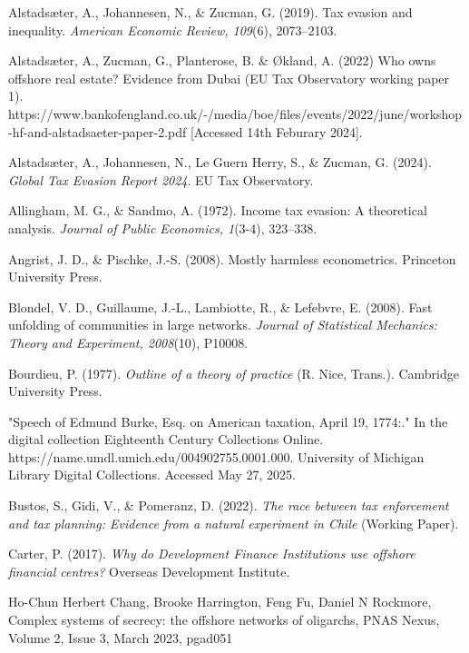 \begin{thebibliography}{99}

Alstads{\ae}ter, A., Johannesen, N., \& Zucman, G. (2019). Tax evasion and inequality. \textit{American Economic Review, 109}(6), 2073–2103. 

Alstadsæter, A., Zucman, G., Planterose, B. \& Økland, A. (2022) Who owns offshore real estate? Evidence from Dubai (EU Tax Observatory working paper 1). https://www.bankofengland.co.uk/-/media/boe/files/events/2022/june/workshop-hf-and-alstadsaeter-paper-2.pdf [Accessed 14th Feburary 2024].

Alstads{\ae}ter, A., Johannesen, N., Le Guern Herry, S., \& Zucman, G. (2024). \textit{Global Tax Evasion Report 2024}. EU Tax Observatory.

Allingham, M. G., \& Sandmo, A. (1972). Income tax evasion: A theoretical analysis. \textit{Journal of Public Economics, 1}(3-4), 323–338. 

Angrist, J. D., \& Pischke, J.-S. (2008). Mostly harmless econometrics. Princeton University Press.

Blondel, V. D., Guillaume, J.-L., Lambiotte, R., \& Lefebvre, E. (2008). Fast unfolding of communities in large networks. \textit{Journal of Statistical Mechanics: Theory and Experiment, 2008}(10), P10008. 

Bourdieu, P. (1977). \textit{Outline of a theory of practice} (R. Nice, Trans.). Cambridge University Press.

"Speech of Edmund Burke, Esq. on American taxation, April 19, 1774:." In the digital collection Eighteenth Century Collections Online. https://name.umdl.umich.edu/004902755.0001.000. University of Michigan Library Digital Collections. Accessed May 27, 2025.

Bustos, S., Gidi, V., \& Pomeranz, D. (2022). \textit{The race between tax enforcement and tax planning: Evidence from a natural experiment in Chile} (Working Paper).

Carter, P. (2017). \textit{Why do Development Finance Institutions use offshore financial centres?} Overseas Development Institute.

Ho-Chun Herbert Chang, Brooke Harrington, Feng Fu, Daniel N Rockmore, Complex systems of secrecy: the offshore networks of oligarchs, PNAS Nexus, Volume 2, Issue 3, March 2023, pgad051


\end{thebibliography}
